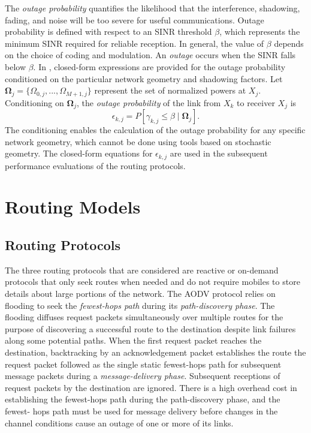 \documentclass[conference]{IEEEtran}
\begin{document}
The \emph{outage probability} quantifies the likelihood that the interference,
shadowing, fading, and noise will be too severe for useful communications.
Outage probability is defined with respect to an SINR threshold $\beta$, which
represents the minimum SINR required for reliable reception. In general, the
value of $\beta$ depends on the choice of coding and modulation. An
\emph{outage} occurs when the SINR falls below $\beta$. In \cite{tor},
closed-form expressions are provided for the outage probability conditioned on
the particular network geometry and shadowing factors. Let $\boldsymbol{\Omega
}_{j}=\{\Omega_{0,j},...,\Omega_{M+1,j}\}$ represent the set of normalized
powers at $X_{j}$. Conditioning on $\boldsymbol{\Omega}_{j}$, the \emph{outage
probability} of the link from $X_{k}$ to receiver $X_{j}$ is
\begin{equation}
\epsilon_{k,j}=P\left[  \gamma_{k,j}\leq\beta\mid\boldsymbol{\Omega}_{j}\right]
.
\end{equation}
The conditioning enables the calculation of the outage probability for any
specific network geometry, which cannot be done using tools based on
stochastic geometry. The closed-form equations for $\epsilon_{k,j}$ are used
in the subsequent performance evaluations of the routing protocols.

\section{Routing Models}

\subsection{Routing Protocols}

The three routing protocols that are considered are
reactive or on-demand protocols that only seek routes
when needed and do not require mobiles to store details about large portions of the network. The AODV protocol relies on flooding to seek the
\emph{fewest-hops path} during its
\emph{path-discovery phase}. The flooding diffuses
request packets simultaneously over multiple routes for
the purpose of discovering a successful route to the destination despite link failures along some potential paths.
When the first request packet reaches the destination,
backtracking by an acknowledgement packet establishes
the route the request packet followed as the single
static fewest-hops path for subsequent message packets
during a \emph{message-delivery phase}. Subsequent receptions
of request packets by the destination are ignored. There
is a high overhead cost in establishing the fewest-hops
path during the path-discovery phase, and the fewest-
hops path must be used for message delivery before
changes in the channel conditions cause an outage of
one or more of its links.
\end{document}

